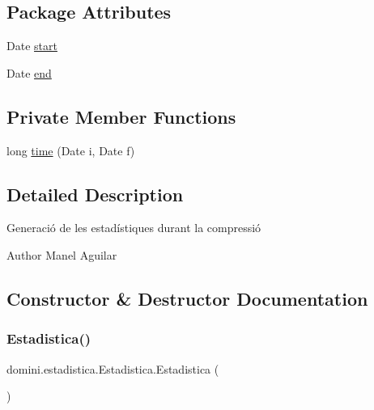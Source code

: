 \subsection*{Package Attributes}
\begin{DoxyCompactItemize}
\item 
Date \hyperlink{classdomini_1_1estadistica_1_1Estadistica_aee0ae604272563ceab4e61392cbd343e}{start}
\item 
Date \hyperlink{classdomini_1_1estadistica_1_1Estadistica_ae99e664f0569e308009ec7ca32864006}{end}
\end{DoxyCompactItemize}
\subsection*{Private Member Functions}
\begin{DoxyCompactItemize}
\item 
long \hyperlink{classdomini_1_1estadistica_1_1Estadistica_a7587e21e3f7f177afe0dd36483c8fe5d}{time} (Date i, Date f)
\end{DoxyCompactItemize}


\subsection{Detailed Description}
Generació de les estadístiques durant la compressió 

\begin{DoxyAuthor}{Author}
Manel Aguilar 
\end{DoxyAuthor}


\subsection{Constructor \& Destructor Documentation}
\mbox{\label{classdomini_1_1estadistica_1_1Estadistica_a16c37d85709413fd65f8dee111faed49}} 
\subsubsection{\texorpdfstring{Estadistica()}{Estadistica()}}
{\footnotesize\ttfamily domini.\+estadistica.\+Estadistica.\+Estadistica (\begin{DoxyParamCaption}{ }\end{DoxyParamCaption})\hspace{0.3cm}{\ttfamily [inline]}}



